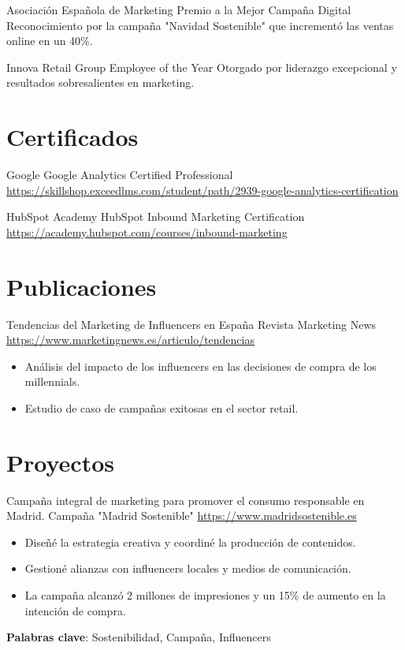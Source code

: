 \documentclass[a4paper, serif, 10pt]{moderncv}
\begin{document}
        {Asociación Española de Marketing}
        {Premio a la Mejor Campaña Digital}
        {}
        {}
        {Reconocimiento por la campaña "Navidad Sostenible" que incrementó las ventas online en un 40\%.}

        {Innova Retail Group}
        {Employee of the Year}
        {}
        {}
        {Otorgado por liderazgo excepcional y resultados sobresalientes en marketing.}
\section{Certificados}

        {Google}
        {Google Analytics Certified Professional}
        {\url{https://skillshop.exceedlms.com/student/path/2939-google-analytics-certification}}
        {}
        {}

        {HubSpot Academy}
        {HubSpot Inbound Marketing Certification}
        {\url{https://academy.hubspot.com/courses/inbound-marketing}}
        {}
        {}
\section{Publicaciones}

        {Tendencias del Marketing de Influencers en España}
        {Revista Marketing News}
        {\url{https://www.marketingnews.es/articulo/tendencias}}
        {}
        {\begin{itemize}
\item Análisis del impacto de los influencers en las decisiones de compra de los millennials.
\item Estudio de caso de campañas exitosas en el sector retail.
\end{itemize}}
\section{Proyectos}

        {Campaña integral de marketing para promover el consumo responsable en Madrid.}
        {Campaña "Madrid Sostenible"}
        {\url{https://www.madridsostenible.es}}
        {}
        {\begin{itemize}
\item Diseñé la estrategia creativa y coordiné la producción de contenidos.
\item Gestioné alianzas con influencers locales y medios de comunicación.
\item La campaña alcanzó 2 millones de impresiones y un 15\% de aumento en la intención de compra.
\end{itemize}
\textbf{Palabras clave}: Sostenibilidad, Campaña, Influencers}
\end{document}
